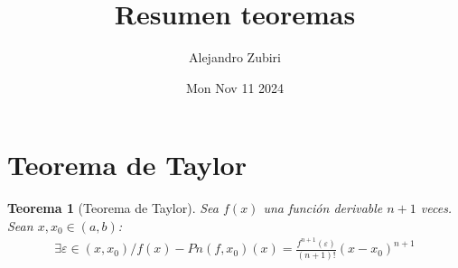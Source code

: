 \documentclass{article}
\author{Alejandro Zubiri}
\date{Mon Nov 11 2024}
\title{Resumen teoremas}
\newtheorem{taylor}{Teorema}
\begin{document}
\maketitle
\tableofcontents
\pagebreak
\section{Teorema de Taylor}
\begin{taylor}[Teorema de Taylor]
    Sea $f(x)$ una función derivable $n+1$ veces. Sean $x,x_{0} \in  (a,b)$:
    \begin{equation}
        \begin{split}
            \exists \varepsilon \in (x,x_{0}) / f(x)-Pn(f,x_{0})(x)= \frac{f^{n+1}(\varepsilon)}{(n+1)!}(x-x_{0})^{n+1}
        \end{split}
    \end{equation}
\end{taylor}
\end{document}
